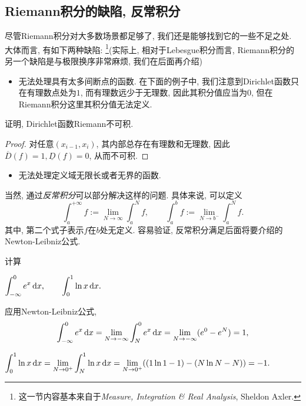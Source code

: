 \subsection{Riemann积分的缺陷, 反常积分}

尽管Riemann积分对大多数场景都足够了, 我们还是能够找到它的一些不足之处. 大体而言, 有如下两种缺陷: \footnote{这一节内容基本来自于\textit{Measure, Integration \& Real Analysis}, Sheldon Axler.}(实际上, 相对于Lebesgue积分而言, Riemann积分的另一个缺陷是与极限换序非常麻烦, 我们在后面再介绍)

\begin{itemize}
	\item 无法处理具有太多间断点的函数. 在下面的例子中, 我们注意到Dirichlet函数只在有理数点处为$1$, 而有理数远少于无理数, 因此其积分值应当为$0$, 但在Riemann积分这里其积分值无法定义. 
\end{itemize}

\begin{example}
	证明, Dirichlet函数Riemann不可积. 
\end{example}
\begin{proof}
	对任意$(x_{i-1},x_i)$, 其内部总存在有理数和无理数, 因此$\overline{D}(f)=1,\underline{D}(f)=0$, 从而不可积. 
\end{proof}

\begin{itemize}
	\item 无法处理定义域无限长或者无界的函数. 
\end{itemize}

当然, 通过\textit{反常积分}可以部分解决这样的问题. 具体来说, 可以定义$$\int_{a}^{+\infty} f := \lim_{N\to \infty} \int_{a}^{N} f,\qquad \int_{a}^{b} f:= \lim_{N \to b^-} \int_{a}^{N} f.$$
其中, 第二个式子表示$f$在$b$处无定义. 容易验证, 反常积分满足后面将要介绍的Newton-Leibniz公式. 

\begin{example}
	计算
	\begin{center}
		$\displaystyle \int_{-\infty}^{0} e^x \mathop{}\!\mathrm{d} x,\qquad \int_{0}^{1} \ln x \mathop{}\!\mathrm{d} x.$
	\end{center}
\end{example}
\begin{solution}
	应用Newton-Leibniz公式, $$\int_{-\infty}^{0} e^x \mathop{}\!\mathrm{d} x = \lim_{N\to -\infty} \int_{N}^{0} e^x \mathop{}\!\mathrm{d} x = \lim_{N\to -\infty} (e^0-e^N)=1,$$
	\begin{center}
		$\displaystyle \int_{0}^{1} \ln x \mathop{}\!\mathrm{d} x = \lim_{N\to 0^+} \int_{N}^{1} \ln x \mathop{}\!\mathrm{d} x = \lim_{N\to 0^+}((1\ln 1-1)-(N\ln N-N))=-1.$
	\end{center}
\end{solution}

